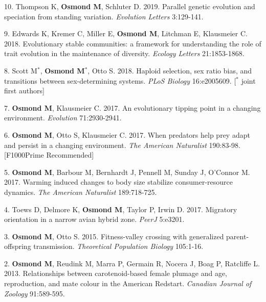 \documentclass[12pt]{article}
\begin{document}
\noindent\hspace{.1cm}10. Thompson K, \textbf{Osmond M}, Schluter D. 2019. Parallel genetic evolution and speciation from standing variation. \textit{Evolution Letters} 3:129-141.

\noindent\hspace{.1cm}9. Edwards K, Kremer C, Miller E, \textbf{Osmond M}, Litchman E, Klausmeier C. 2018. Evolutionary stable communities: a framework for understanding the role of trait evolution in the maintenance of diversity. \textit{Ecology Letters} 21:1853-1868.

\noindent\hspace{.1cm}8. Scott M$^*$, \textbf{Osmond M}$^*$, Otto S. 2018. Haploid selection, sex ratio bias, and transitions between sex-determining systems. \textit{PLoS Biology} 16:e2005609. [$^*$ joint first authors]

\noindent\hspace{.1cm}7. \textbf{Osmond M}, Klausmeier C. 2017. An evolutionary tipping point in a changing environment. \textit{Evolution} 71:2930-2941.

\noindent\hspace{.1cm}6. \textbf{Osmond M}, Otto S, Klausmeier C. 2017. When predators help prey adapt and persist in a changing environment. \textit{The American Naturalist} 190:83-98. [F1000Prime Recommended]

\noindent\hspace{.1cm}5. \textbf{Osmond M}, Barbour M, Bernhardt J, Pennell M, Sunday J, O'Connor M. 2017. Warming induced changes to body size stabilize consumer-resource dynamics. \textit{The American Naturalist} 189:718-725.

\noindent\hspace{.1cm}4. Toews D, Delmore K, \textbf{Osmond M}, Taylor P, Irwin D. 2017. Migratory orientation in a narrow avian hybrid zone. \textit{PeerJ} 5:e3201.

\noindent\hspace{.1cm}3. \textbf{Osmond M}, Otto S. 2015. Fitness-valley crossing with generalized parent-offspring transmission. \textit{Theoretical Population Biology} 105:1-16. %

\noindent\hspace{.1cm}2. \textbf{Osmond M}, Reudink M, Marra P, Germain R, Nocera J,  Boag P, Ratcliffe L.  2013. Relationships between carotenoid-based female plumage and age, reproduction, and mate colour in the American Redstart. \textit{Canadian Journal of Zoology} 91:589-595. %
\end{document}
